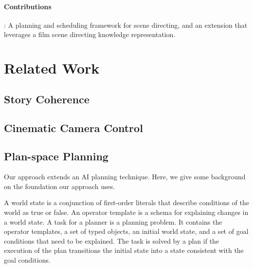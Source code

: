 \documentclass[letterpaper]{article}
\begin{document}
\paragraph{Contributions}: A planning and scheduling framework for scene directing, and an extension that leverages a film scene directing knowledge representation.

\section{Related Work}

\subsection{Story Coherence}

\subsection{Cinematic Camera Control}



\subsection{Plan-space Planning}

Our approach extends an AI planning technique. Here, we give some background on the foundation our approach uses. 

A world state is a conjunction of first-order literals that describe conditions of the world as true or false. An operator template is a schema for explaining changes in a world state. A task for a planner is a planning problem. It contains the operator templates, a set of typed objects, an initial world state, and a set of goal conditions that need to be explained. The task is solved by a plan if the execution of the plan transitions the initial state into a state consistent with the goal conditions.
\end{document}
